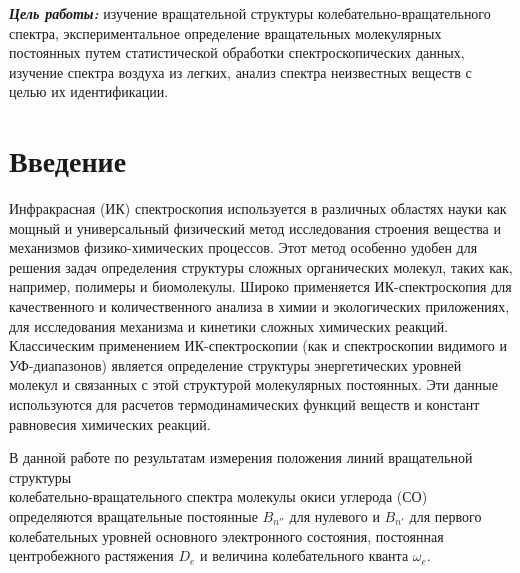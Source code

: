 \begin{center}
\end{center}

\textbf{\emph{Цель работы:}} изучение вращательной структуры колебательно-вращательного спектра, экспериментальное определение вращательных молекулярных постоянных путем статистической обработки спектроскопических данных, изучение спектра воздуха из легких, анализ спектра неизвестных веществ с целью их идентификации.
\section{Введение}
Инфракрасная (ИК) спектроскопия используется в различных областях науки как мощный и универсальный физический метод исследования строения вещества и механизмов физико-химических процессов.
Этот метод особенно удобен для решения задач определения структуры
сложных органических молекул, таких как, например, полимеры и биомолекулы. Широко применяется ИК-спектроскопия для качественного
и количественного анализа в химии и экологических приложениях, для
исследования механизма и кинетики сложных химических реакций.
Классическим применением ИК-спектроскопии (как и спектроскопии
видимого и УФ-диапазонов) является определение структуры энергетических уровней молекул и связанных с этой структурой молекулярных
постоянных. Эти данные используются для расчетов термодинамических функций веществ и констант равновесия химических реакций.

В данной работе по результатам измерения положения линий вращательной структуры \\колебательно-вращательного спектра молекулы
окиси углерода (СО) определяются вращательные постоянные $B_{n''}$ для
нулевого и $B_{n'}$ для первого колебательных уровней основного электронного состояния, постоянная центробежного растяжения $D_e$ и величина колебательного кванта $\omega_e$.
